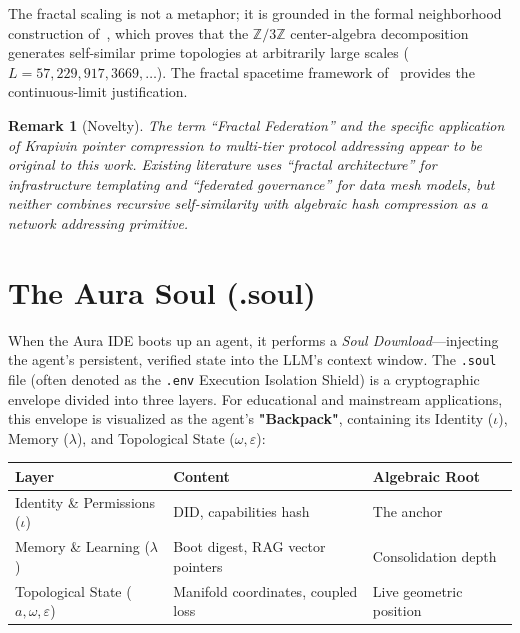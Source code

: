 \documentclass[12pt,a4paper]{article}
\newtheorem{remark}[theorem]{Remark}
\begin{document}
The fractal scaling is not a metaphor; it is grounded in the formal neighborhood construction of~\cite{PP-I-Ch8}, which proves that the $\mathbb{Z}/3\mathbb{Z}$ center-algebra decomposition generates self-similar prime topologies at arbitrarily large scales ($L = 57, 229, 917, 3669, \ldots$). The fractal spacetime framework of~\cite{PP-I-Ch6} provides the continuous-limit justification.

\begin{remark}[Novelty]
The term ``Fractal Federation'' and the specific application of Krapivin pointer compression to multi-tier protocol addressing appear to be original to this work. Existing literature uses ``fractal architecture'' for infrastructure templating and ``federated governance'' for data mesh models, but neither combines recursive self-similarity with algebraic hash compression as a network addressing primitive.
\end{remark}

\section{The Aura Soul (.soul)}
\label{sec:soul}

When the Aura IDE boots up an agent, it performs a \emph{Soul Download}---injecting the agent's persistent, verified state into the LLM's context window. The \texttt{.soul} file (often denoted as the \texttt{.env} Execution Isolation Shield) is a cryptographic envelope divided into three layers. For educational and mainstream applications, this envelope is visualized as the agent's \textbf{"Backpack"}, containing its Identity ($\iota$), Memory ($\lambda$), and Topological State ($\omega, \varepsilon$):

\begin{center}
\small
\begin{tabular}{@{}lll@{}}
\toprule
\textbf{Layer} & \textbf{Content} & \textbf{Algebraic Root} \\
\midrule
Identity \& Permissions ($\iota$) & DID, capabilities hash & The anchor \\
Memory \& Learning ($\lambda$) & Boot digest, RAG vector pointers & Consolidation depth \\
Topological State ($a, \omega, \varepsilon$) & Manifold coordinates, coupled loss & Live geometric position \\
\bottomrule
\end{tabular}
\end{center}
\end{document}
